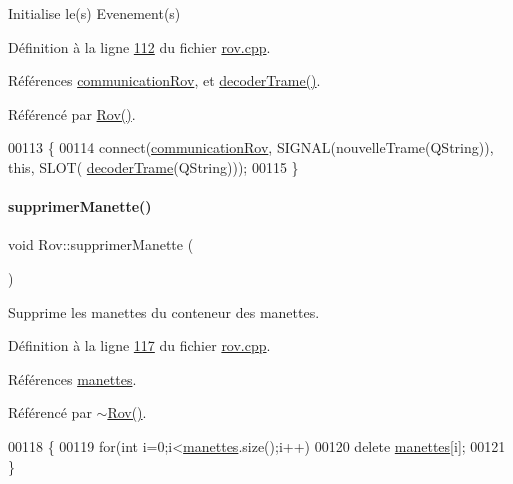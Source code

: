 Initialise le(s) Evenement(s) 



Définition à la ligne \hyperlink{rov_8cpp_source_l00112}{112} du fichier \hyperlink{rov_8cpp_source}{rov.\+cpp}.



Références \hyperlink{rov_8h_source_l00097}{communication\+Rov}, et \hyperlink{rov_8cpp_source_l00180}{decoder\+Trame()}.



Référencé par \hyperlink{rov_8cpp_source_l00011}{Rov()}.


\begin{DoxyCode}
00113 \{
00114     connect(\hyperlink{class_rov_a8e7aaa17ee2134f26d57241d11ab2a99}{communicationRov}, SIGNAL(nouvelleTrame(QString)), \textcolor{keyword}{this}, SLOT(
      \hyperlink{class_rov_ad818ff6ee1210ae44a24106b2bbbee7d}{decoderTrame}(QString)));
00115 \}
\end{DoxyCode}
\mbox{\label{class_rov_a31f810925200612a6bb4728236c695ed}} 
\paragraph{\texorpdfstring{supprimer\+Manette()}{supprimerManette()}}
{\footnotesize\ttfamily void Rov\+::supprimer\+Manette (\begin{DoxyParamCaption}{ }\end{DoxyParamCaption})\hspace{0.3cm}{\ttfamily [private]}}



Supprime les manettes du conteneur des manettes. 



Définition à la ligne \hyperlink{rov_8cpp_source_l00117}{117} du fichier \hyperlink{rov_8cpp_source}{rov.\+cpp}.



Références \hyperlink{rov_8h_source_l00099}{manettes}.



Référencé par \hyperlink{rov_8cpp_source_l00022}{$\sim$\+Rov()}.


\begin{DoxyCode}
00118 \{
00119     \textcolor{keywordflow}{for}(\textcolor{keywordtype}{int} i=0;i<\hyperlink{class_rov_a58ea20dc3615a732b87ac381bf1c0a83}{manettes}.size();i++)
00120         \textcolor{keyword}{delete} \hyperlink{class_rov_a58ea20dc3615a732b87ac381bf1c0a83}{manettes}[i];
00121 \}
\end{DoxyCode}


